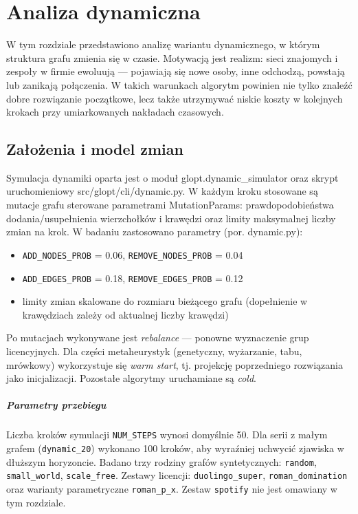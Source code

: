 \chapter{Analiza dynamiczna}\label{chap:dynamic}

W tym rozdziale przedstawiono analizę wariantu dynamicznego, w którym struktura grafu zmienia się w czasie. Motywacją jest realizm: sieci znajomych i zespoły w firmie ewoluują — pojawiają się nowe osoby, inne odchodzą, powstają lub zanikają połączenia. W takich warunkach algorytm powinien nie tylko znaleźć dobre rozwiązanie początkowe, lecz także utrzymywać niskie koszty w kolejnych krokach przy umiarkowanych nakładach czasowych.

\section{Założenia i model zmian}

Symulacja dynamiki oparta jest o moduł glopt.dynamic\_simulator oraz skrypt uruchomieniowy src/glopt/cli/dynamic.py. W każdym kroku stosowane są mutacje grafu sterowane parametrami MutationParams: prawdopodobieństwa dodania/usupełnienia wierzchołków i krawędzi oraz limity maksymalnej liczby zmian na krok. W badaniu zastosowano parametry (por. dynamic.py):
\begin{itemize}
  \item \texttt{ADD\_NODES\_PROB} = 0.06, \texttt{REMOVE\_NODES\_PROB} = 0.04
  \item \texttt{ADD\_EDGES\_PROB} = 0.18, \texttt{REMOVE\_EDGES\_PROB} = 0.12
  \item limity zmian skalowane do rozmiaru bieżącego grafu (dopełnienie w krawędziach zależy od aktualnej liczby krawędzi)
\end{itemize}
Po mutacjach wykonywane jest \emph{rebalance} — ponowne wyznaczenie grup licencyjnych. Dla części metaheurystyk (genetyczny, wyżarzanie, tabu, mrówkowy) wykorzystuje się \emph{warm start}, tj. projekcję poprzedniego rozwiązania jako inicjalizacji. Pozostałe algorytmy uruchamiane są \emph{cold}.

\paragraph{Parametry przebiegu} Liczba kroków symulacji \texttt{NUM\_STEPS} wynosi domyślnie 50. Dla serii z małym grafem (\texttt{dynamic\_20}) wykonano 100 kroków, aby wyraźniej uchwycić zjawiska w dłuższym horyzoncie. Badano trzy rodziny grafów syntetycznych: \texttt{random}, \texttt{small\_world}, \texttt{scale\_free}. Zestawy licencji: \texttt{duolingo\_super}, \texttt{roman\_domination} oraz warianty parametryczne \texttt{roman\_p\_x}. Zestaw \texttt{spotify} nie jest omawiany w tym rozdziale.

